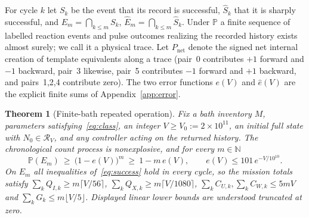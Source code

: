 \documentclass[11pt,a4paper]{article}
\theoremstyle{plain}
\newtheorem{theorem}{Theorem}[section]
\theoremstyle{definition}
\theoremstyle{remark}
\newcommand{\N}{\mathbb N}
\newcommand{\Prob}{\mathbb P}
\newcommand{\cR}{\mathcal R}
\newcommand{\Pnet}{P_{\mathrm{net}}}
\begin{document}
For cycle $k$ let $S_k$ be the event that its record is successful, $\widehat S_k$ that it is sharply successful, and $E_m=\bigcap_{k\le m}S_k$, $\widehat E_m=\bigcap_{k\le m}\widehat S_k$. Under $\Prob$ a finite sequence of labelled reaction events and pulse outcomes realizing the recorded history exists almost surely; we call it a physical trace. Let $\Pnet$ denote the signed net internal creation of template equivalents along a trace (pair~0 contributes $+1$ forward and $-1$ backward, pair~3 likewise, pair~5 contributes $-1$ forward and $+1$ backward, and pairs~1,2,4 contribute zero). The two error functions $e(V)$ and $\widehat e(V)$ are the explicit finite sums of Appendix~\ref{app:error}.

\begin{theorem}[Finite-bath repeated operation]\label{thm:main}
Fix a bath inventory $M$, parameters satisfying~\eqref{eq:class}, an integer $V\ge V_0:=2\times10^{11}$, an initial full state with $N_0\in\cR_V$, and any controller acting on the returned history. The chronological count process is nonexplosive, and for every $m\in\N$
\begin{equation}\label{eq:probability}
\Prob(E_m)\ \ge\ \bigl(1-e(V)\bigr)^m\ \ge\ 1-m\,e(V),\qquad e(V)\le101\,e^{-V/10^{10}} .
\end{equation}
On $E_m$ all inequalities of~\eqref{eq:success} hold in every cycle, so the mission totals satisfy $\sum_kQ_{I,k}\ge m\lceil V/56\rceil$, $\sum_kQ_{X,k}\ge m\lceil V/1080\rceil$, $\sum_kC_{U,k},\sum_kC_{W,k}\le5mV$ and $\sum_kG_k\le m\lfloor V/5\rfloor$. Displayed linear lower bounds are understood truncated at zero.
\end{theorem}
\end{document}
